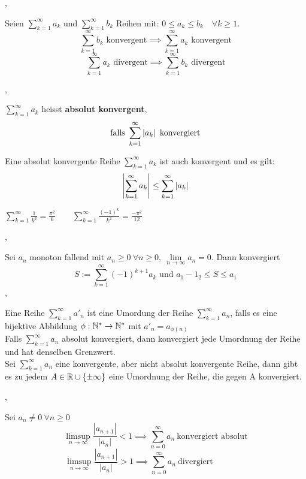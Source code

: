 \sep

\Korollar[2.7.7 (Vergleichssatz)] Seien $\sum_{k=1}^{\infty} a_{k}$ und $\sum_{k=1}^{\infty} b_{k}$ Reihen mit: $0 \leq a_{k} \leq b_{k} \quad \forall k \geq 1. $
\[ \sum_{k=1}^{\infty} b_{k} \text{ konvergent} \implies \sum_{k=1}^{\infty} a_{k} \text{ konvergent} \]
\[ \sum_{k=1}^{\infty} a_{k} \text{ divergent} \implies \sum_{k=1}^{\infty} b_{k} \text{ divergent} \]

\sep

\Satz[2.7.9] $\sum_{k=1}^{\infty} a_{k}$ heisst \textbf{absolut konvergent}, 
\[ \text{falls } \sum_{k=1}^{\infty} \left\lvert a_{k} \right\rvert \text{ konvergiert} \]

\Satz[2.7.10] Eine absolut konvergente Reihe $\sum_{k=1}^{\infty} a_{k}$ ist auch konvergent und es gilt:
\[ \left\lvert \sum_{k=1}^{\infty} a_{k} \right\rvert \leq \sum_{k=1}^{\infty} \left\lvert a_{k} \right\rvert\]

\Bsp $\sum_{k=1}^{\infty} \frac{1}{k^2} = \frac{\pi^2}{6} \quad \quad \sum_{k=1}^{\infty} \frac{(-1)^k}{k^2} = \frac{-\pi^2}{12}$ 
 
\sep

\Satz[2.7.12 Leibniz] Sei $a_{n}$ monoton fallend mit $a_{n} \geq 0 \ \forall n \geq 0, \ \lim\limits_{n \rightarrow \infty} a_{n} = 0.$ Dann konvergiert
\[ S :=  \sum_{k=1}^{\infty} (-1)^{k+1} a_{k} \text{ und } a_{1} - 1_{2} \leq S \leq {a_1} \]
\sep

\Def[2.7.14] Eine Reihe  $\sum_{k=1}^{\infty} a'_{n}$ ist eine Umordung der Reihe  $\sum_{k=1}^{\infty} a_{n}$, falls es eine bijektive Abbildung $\phi : \mathbb{N}^{*} \rightarrow \mathbb{N}^{*}$ mit $a'_{n} = a_{\phi(n)}$  \\

\Satz[2.7.16 Dirichlet] Falls $\sum_{k=1}^{\infty} a_{n}$ absolut konvergiert, dann konvergiert jede Umordnung der Reihe und hat denselben Grenzwert.   \\

\Satz[Riemann] Sei $\sum_{k=1}^{\infty} a_{n}$ eine konvergente, aber nicht absolut konvergente Reihe, dann gibt es zu jedem $A \in \mathbb{R} \cup \{\pm \infty\}$ eine Umordnung der Reihe, die gegen A konvergiert. 

\sep

\Satz[Quotientenkriterium] Sei $a_{n} \neq 0 \ \forall n \geq 0$
\[\limsup\limits_{n \rightarrow \infty} \frac{\left|a_{n+1}\right|}{\left|a_{n}\right|}<1 \implies \sum_{n=0}^{\infty} a_{n} \ \text{konvergiert absolut}\]
\[\limsup\limits_{n \rightarrow \infty} \frac{\left|a_{n+1}\right|}{\left|a_{n}\right|}>1 \implies \sum_{n=0}^{\infty} a_{n} \ \text{divergiert} \quad \quad \quad \quad\]

